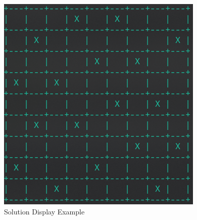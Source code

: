 \documentclass[runningheads]{llncs}
\begin{document}
\begin{figure}
    \begin{center}
        \includegraphics[scale=0.5]{images/fig2.png}
        \caption{Solution Display Example} \label{fig2}
    \end{center}
\end{figure}
\end{document}
